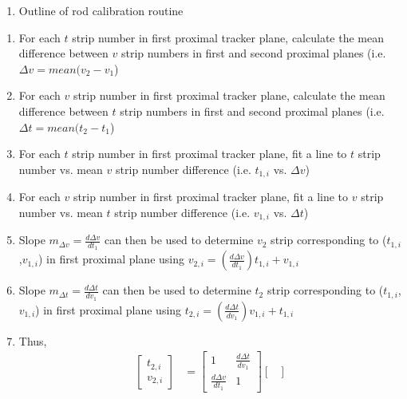 \documentclass{article}
\begin{document}
\begin{enumerate}[label = (\arabic*), leftmargin = 0.0cm, series = section]
\bfseries
\item Outline of rod calibration routine
\end{enumerate}
\begin{enumerate}
    \item For each $t$ strip number in first proximal tracker plane, calculate the mean difference between $v$ strip numbers in first and second proximal planes (i.e. $\Delta v = mean(v_2 - v_1$)
    \item For each $v$ strip number in first proximal tracker plane, calculate the mean difference between $t$ strip numbers in first and second proximal planes (i.e. $\Delta t = mean(t_2 - t_1$)
    \item For each $t$ strip number in first proximal tracker plane, fit a line to $t$ strip number vs. mean $v$ strip number difference (i.e. $t_{1,i}$ vs. $\Delta v$)
    \item For each $v$ strip number in first proximal tracker plane, fit a line to $v$ strip number vs. mean $t$ strip number difference (i.e. $v_{1,i}$ vs. $\Delta t$)
    \item Slope $m_{\Delta v} = \tfrac{d\Delta v}{dt_1}$ can then be used to determine $v_2$ strip corresponding to ($t_{1,i}$,$v_{1,i}$) in first proximal plane using $v_{2,i} = \left(\tfrac{d\Delta v}{dt_1}\right)t_{1,i} + v_{1,i}$
    \item Slope $m_{\Delta t} = \tfrac{d\Delta t}{dv_1}$ can then be used to determine $t_2$ strip corresponding to ($t_{1,i}$,$v_{1,i}$) in first proximal plane using $t_{2,i} = \left(\tfrac{d\Delta t}{dv_1}\right)v_{1,i} + t_{1,i}$
    \item Thus, 
    \begin{align*}
        \begin{bmatrix}
            t_{2,i}\\
            v_{2,i}
        \end{bmatrix}
        &=
        \begin{bmatrix}
            1                           & \tfrac{d\Delta t}{dv_1}\\
            \tfrac{d\Delta v}{dt_1}     & 1
        \end{bmatrix}
        \begin{bmatrix}

\end{bmatrix}
\end{align*}
\end{enumerate}
\end{document}
